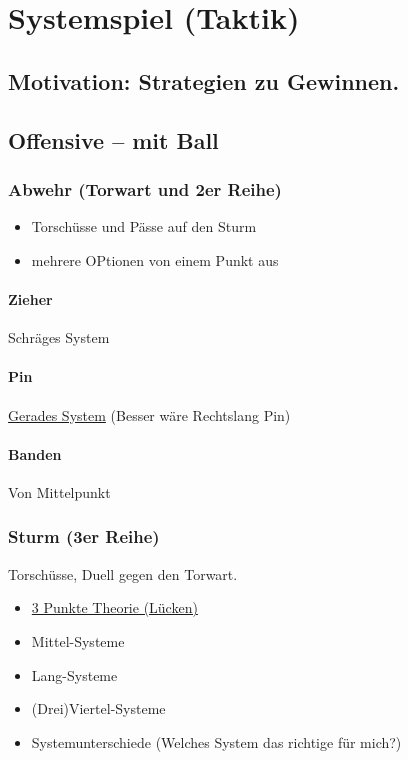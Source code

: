 \chapter{Systemspiel (Taktik)}
\label{taktik}

\section{Motivation: Strategien zu Gewinnen.}


\section{Offensive -- mit Ball}

\subsection{Abwehr (Torwart und 2er Reihe)}
\label{taktik:offensive:abwehr}

\begin{itemize}
\item Torschüsse und Pässe auf den Sturm 
\item mehrere OPtionen von einem Punkt aus
\end{itemize}

\subsubsection{Zieher}
Schräges System

\subsubsection{Pin}
\href{http://ungeblogtkickern.blogspot.de/2014/12/schusssystem-linkslang-pin-aus-der.html}{Gerades System}
(Besser wäre Rechtslang Pin)

\subsubsection{Banden}
Von Mittelpunkt



\subsection{Sturm (3er Reihe)}
\label{taktik:offensive:sturm}

Torschüsse, Duell gegen den Torwart.

\begin{itemize}
\item \href{http://ungeblogtkickern.blogspot.de/2015/11/3-punkte-theorie-auf-der-3er-reihe.html}{3 Punkte Theorie (Lücken)}
\item Mittel-Systeme
\item Lang-Systeme
\item (Drei)Viertel-Systeme
\item Systemunterschiede (Welches System das richtige für mich?)
\end{itemize}

